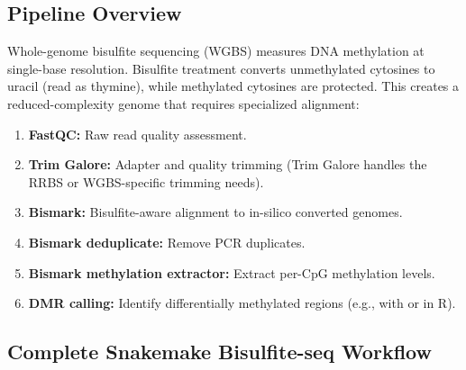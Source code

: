 \subsection{Pipeline Overview}

Whole-genome bisulfite sequencing (WGBS) measures DNA methylation at single-base resolution. Bisulfite treatment converts unmethylated cytosines to uracil (read as thymine), while methylated cytosines are protected. This creates a reduced-complexity genome that requires specialized alignment:

\begin{enumerate}[itemsep=2pt]
  \item \textbf{FastQC:} Raw read quality assessment.
  \item \textbf{Trim Galore:} Adapter and quality trimming (Trim Galore handles the RRBS or WGBS-specific trimming needs).
  \item \textbf{Bismark:} Bisulfite-aware alignment to in-silico converted genomes.
  \item \textbf{Bismark deduplicate:} Remove PCR duplicates.
  \item \textbf{Bismark methylation extractor:} Extract per-CpG methylation levels.
  \item \textbf{DMR calling:} Identify differentially methylated regions (e.g., with  or  in R).
\end{enumerate}

\subsection{Complete Snakemake Bisulfite-seq Workflow}

